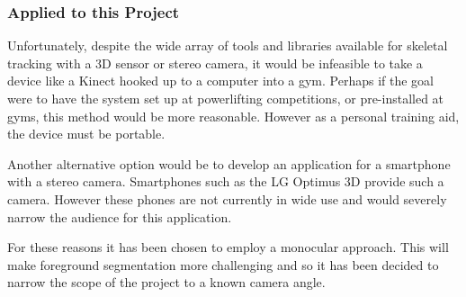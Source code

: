 \subsubsection{Applied to this Project}

Unfortunately, despite the wide array of tools and libraries available for skeletal tracking with a 3D sensor or stereo camera, it would be infeasible to take a device like a Kinect hooked up to a computer into a gym. Perhaps if the goal were to have the system set up at powerlifting competitions, or pre-installed at gyms, this method would be more reasonable. However as a personal training aid, the device must be portable.

Another alternative option would be to develop an application for a smartphone with a stereo camera. Smartphones such as the LG Optimus 3D\cite{lgoptimus} provide such a camera. However these phones are not currently in wide use and would severely narrow the audience for this application.

For these reasons it has been chosen to employ a monocular approach. This will make foreground segmentation more challenging and so it has been decided to narrow the scope of the project to a known camera angle.